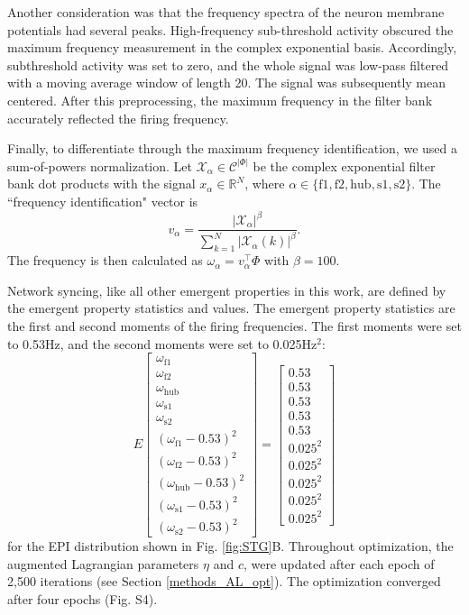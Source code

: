 \documentclass[11pt]{article}
\begin{document}
Another consideration was that the frequency spectra of the neuron membrane potentials had several peaks.  High-frequency sub-threshold activity obscured the maximum frequency measurement in the complex exponential basis.  Accordingly, subthreshold activity was set to zero, and the whole signal was low-pass filtered with a moving average window of length 20.  The signal was subsequently mean centered.  After this preprocessing, the maximum frequency in the filter bank accurately reflected the firing frequency.

Finally, to differentiate through the maximum frequency identification, we used a sum-of-powers normalization.  Let $\mathcal{X}_\alpha \in \mathcal{C}^{|\Phi|}$ be the complex exponential filter bank dot products with the signal $x_\alpha \in \mathbb{R}^{N}$, where $\alpha \in \{ \text{f1}, \text{f2}, \text{hub}, \text{s1}, \text{s2} \}$.  The ``frequency identification" vector is 
\begin{equation}
v_\alpha = \frac{|\mathcal{X}_\alpha|^\beta}{\sum_{k=1}^N |\mathcal{X}_\alpha(k)|^\beta}.
\end{equation}
The frequency is then calculated as $\omega_\alpha = v_\alpha^\top \Phi$ with $\beta = 100$.

Network syncing, like all other emergent properties in this work, are defined by the emergent property statistics and values.  The emergent property statistics are the first and second moments of the firing frequencies. The first moments were set to 0.53Hz, and the second moments were set to 0.025Hz$^2$:
\begin{equation}
E \begin{bmatrix} \omega_{\text{f1}} \\ \omega_{\text{f2}} \\ \omega_{\text{hub}} \\ \omega_{\text{s1}} \\ \omega_{\text{s2}} \\ (\omega_{\text{f1}} - 0.53)^2 \\ (\omega_{\text{f2}} - 0.53)^2 \\ (\omega_{\text{hub}} - 0.53)^2 \\ (\omega_{\text{s1}} - 0.53)^2 \\ (\omega_{\text{s2}} - 0.53)^2  \end{bmatrix} = \begin{bmatrix} 0.53 \\ 0.53 \\ 0.53 \\ 0.53 \\ 0.53 \\ 0.025^2 \\ 0.025^2 \\ 0.025^2 \\ 0.025^2 \\ 0.025^2 \end{bmatrix}
\end{equation}
for the EPI distribution shown in Fig. \ref{fig:STG}B.
Throughout optimization, the augmented Lagrangian parameters $\eta$ and $c$, were updated after each epoch of 2,500 iterations (see Section \ref{methods_AL_opt}).  The optimization converged after four epochs (Fig. S4).
\end{document}
